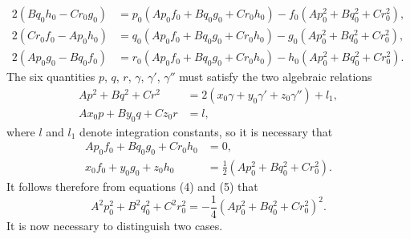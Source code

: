 \documentclass{article}
\begin{document}
\begin{equation}
\begin{aligned}
2(Bq_0h_0 - Cr_0g_0) &= p_0(Ap_0f_0 + Bq_0g_0 + Cr_0h_0) - f_0(Ap_0^2 + Bq_0^2 + Cr_0^2), \\
2(Cr_0f_0 - Ap_0h_0) &= q_0(Ap_0f_0 + Bq_0g_0 + Cr_0h_0) - g_0(Ap_0^2 + Bq_0^2 + Cr_0^2), \\
2(Ap_0g_0 - Bq_0f_0) &= r_0(Ap_0f_0 + Bq_0g_0 + Cr_0h_0) - h_0(Ap_0^2 + Bq_0^2 + Cr_0^2).
\end{aligned}
\end{equation}
The six quantities $p$, $q$, $r$, $\gamma$, $\gamma'$, $\gamma''$ must satisfy the two algebraic relations
\begin{align*}
Ap^2 + Bq^2 + Cr^2 &= 2(x_0\gamma + y_0\gamma' + z_0\gamma'') + l_1, \\
Ax_0p + By_0q + Cz_0r &= l,
\end{align*}
where $l$ and $l_1$ denote integration constants, so it is necessary that
\begin{align*}
Ap_0f_0 + Bq_0g_0 + Cr_0h_0 &= 0, \\
x_0f_0 + y_0g_0 + z_0h_0 &= \frac{1}{2}(Ap_0^2 + Bq_0^2 + Cr_0^2).
\end{align*}
It follows therefore from equations (4) and (5) that
\[
A^2p_0^2 + B^2q_0^2 + C^2r_0^2 = -\frac{1}{4}(Ap_0^2 + Bq_0^2 + Cr_0^2)^2.
\]
It is now necessary to distinguish two cases.
\end{document}
